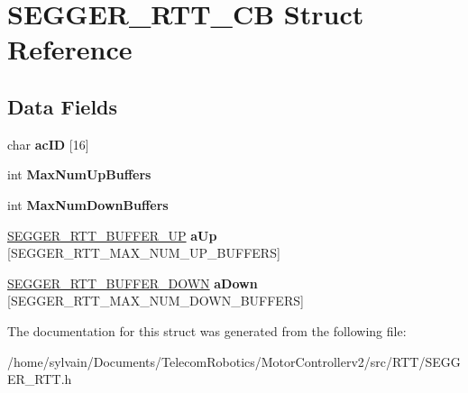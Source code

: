\hypertarget{structSEGGER__RTT__CB}{}\section{S\+E\+G\+G\+E\+R\+\_\+\+R\+T\+T\+\_\+\+CB Struct Reference}
\label{structSEGGER__RTT__CB}
\subsection*{Data Fields}
\begin{DoxyCompactItemize}
\item 
\hypertarget{structSEGGER__RTT__CB_af91aeb3c800fed5306a57f5b688888a9}{}\label{structSEGGER__RTT__CB_af91aeb3c800fed5306a57f5b688888a9} 
char {\bfseries ac\+ID} \mbox{[}16\mbox{]}
\item 
\hypertarget{structSEGGER__RTT__CB_ae8607ab235f59d17b0d471c19c294b03}{}\label{structSEGGER__RTT__CB_ae8607ab235f59d17b0d471c19c294b03} 
int {\bfseries Max\+Num\+Up\+Buffers}
\item 
\hypertarget{structSEGGER__RTT__CB_a62aaabc4dcc0cb4164c5f54da753d7e9}{}\label{structSEGGER__RTT__CB_a62aaabc4dcc0cb4164c5f54da753d7e9} 
int {\bfseries Max\+Num\+Down\+Buffers}
\item 
\hypertarget{structSEGGER__RTT__CB_af27ec025b21e2a8e42db0a19351cfff9}{}\label{structSEGGER__RTT__CB_af27ec025b21e2a8e42db0a19351cfff9} 
\hyperlink{structSEGGER__RTT__BUFFER__UP}{S\+E\+G\+G\+E\+R\+\_\+\+R\+T\+T\+\_\+\+B\+U\+F\+F\+E\+R\+\_\+\+UP} {\bfseries a\+Up} \mbox{[}S\+E\+G\+G\+E\+R\+\_\+\+R\+T\+T\+\_\+\+M\+A\+X\+\_\+\+N\+U\+M\+\_\+\+U\+P\+\_\+\+B\+U\+F\+F\+E\+RS\mbox{]}
\item 
\hypertarget{structSEGGER__RTT__CB_a459f2d8a20dced065dbd54afbdf434e5}{}\label{structSEGGER__RTT__CB_a459f2d8a20dced065dbd54afbdf434e5} 
\hyperlink{structSEGGER__RTT__BUFFER__DOWN}{S\+E\+G\+G\+E\+R\+\_\+\+R\+T\+T\+\_\+\+B\+U\+F\+F\+E\+R\+\_\+\+D\+O\+WN} {\bfseries a\+Down} \mbox{[}S\+E\+G\+G\+E\+R\+\_\+\+R\+T\+T\+\_\+\+M\+A\+X\+\_\+\+N\+U\+M\+\_\+\+D\+O\+W\+N\+\_\+\+B\+U\+F\+F\+E\+RS\mbox{]}
\end{DoxyCompactItemize}


The documentation for this struct was generated from the following file\+:\begin{DoxyCompactItemize}
\item 
/home/sylvain/\+Documents/\+Telecom\+Robotics/\+Motor\+Controllerv2/src/\+R\+T\+T/S\+E\+G\+G\+E\+R\+\_\+\+R\+T\+T.\+h\end{DoxyCompactItemize}
